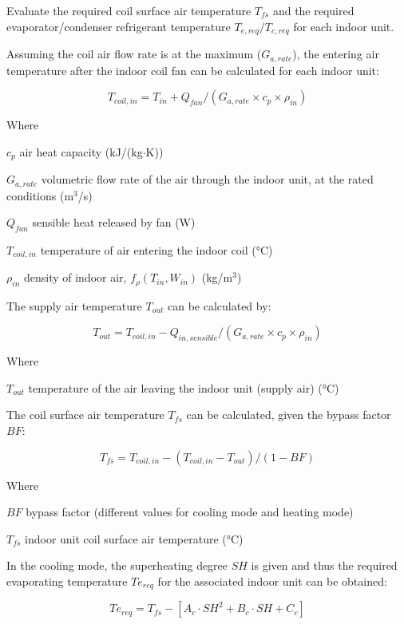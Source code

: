 Evaluate the required coil surface air temperature $T_{fs}$ and the required evaporator/condenser refrigerant temperature $T_{e,req}/{T_{c,req}}$ for each indoor unit. 

Assuming the coil air flow rate is at the maximum ($G_{a,rate}$), the entering air temperature after the indoor coil fan can be calculated for each indoor unit:

\begin{equation}
  T_{coil,in}=T_{in}+Q_{fan}/(G_{a,rate}\times{c_p}\times\rho_{in})
\end{equation}

Where

$c_p$	air heat capacity (kJ/(kg$\cdot$K))

$G_{a,rate}$	volumetric flow rate of the air through the indoor unit, at the rated conditions (m\(^3\)/s)

$Q_{fan}$	sensible heat released by fan (W)

$T_{coil,in}$	temperature of air entering the indoor coil (°C)

$\rho_{in}$	density of indoor air, $f_{\rho}(T_{in},W_{in})$  (kg/m\(^3\))

The supply air temperature $T_{out}$ can be calculated by:

\begin{equation}
  T_{out} = T_{coil,in} - Q_{in, sensible} / (G_{a,rate}\times{c_p}\times\rho_{in})
\end{equation}

Where

$T_{out}$	temperature of the air leaving the indoor unit (supply air) (°C)

The coil surface air temperature $T_{fs}$ can be calculated, given the bypass factor $BF$:

\begin{equation}
  T_{fs}= T_{coil,in} - (T_{coil,in}-T_{out}) / (1-BF)
\end{equation}

Where

$BF$ bypass factor (different values for cooling mode and heating mode) 

$T_{fs}$ indoor unit coil surface air temperature (°C)

In the cooling mode, the superheating degree $SH$ is given and thus the required evaporating temperature $Te_{req}$ for the associated indoor unit can be obtained:

\begin{equation}
  Te_{req}=T_{fs}-[A_c\cdot SH^2+B_c\cdot SH+C_c]
\end{equation}
 
